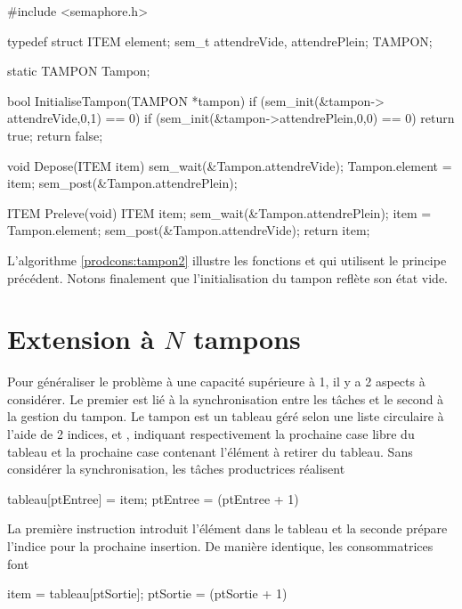 \begin{codeblock}[title=Algorithme de synchronisation pour un tampon,label=prodcons:tampon2]
#include <semaphore.h>

typedef struct {
  ITEM element;
  sem_t attendreVide, attendrePlein;
} TAMPON;

static TAMPON Tampon;

bool InitialiseTampon(TAMPON *tampon) {
  if (sem_init(&tampon-> attendreVide,0,1) == 0)
    if (sem_init(&tampon->attendrePlein,0,0) == 0)
      return true;
  return false;
}

void Depose(ITEM item) {
  sem_wait(&Tampon.attendreVide);
  Tampon.element = item;
  sem_post(&Tampon.attendrePlein);
}

ITEM Preleve(void) {
  ITEM item;
  sem_wait(&Tampon.attendrePlein);
  item = Tampon.element;
  sem_post(&Tampon.attendreVide);
  return item;
}
\end{codeblock}

L'algorithme \ref{prodcons:tampon2} illustre les fonctions  et  qui utilisent le principe précédent. Notons finalement que l'initialisation du tampon reflète son état vide.

\section{Extension à $N$ tampons}
Pour généraliser le problème à une capacité supérieure à 1, il y a 2 aspects à considérer. Le premier est lié à la synchronisation entre les tâches et le second à la gestion du tampon.
Le tampon est un tableau géré selon une liste circulaire à l'aide de 2 indices,  et , indiquant respectivement la prochaine case libre du tableau et la prochaine case contenant l'élément à retirer du tableau. Sans considérer la synchronisation, les tâches productrices réalisent

\begin{codeblock}
tableau[ptEntree] = item;
ptEntree = (ptEntree + 1) %
\end{codeblock}

La première instruction introduit l'élément dans le tableau et la seconde prépare l'indice pour la prochaine insertion. De manière identique, les consommatrices font

\begin{codeblock}
item = tableau[ptSortie];
ptSortie = (ptSortie + 1) %
\end{codeblock}

